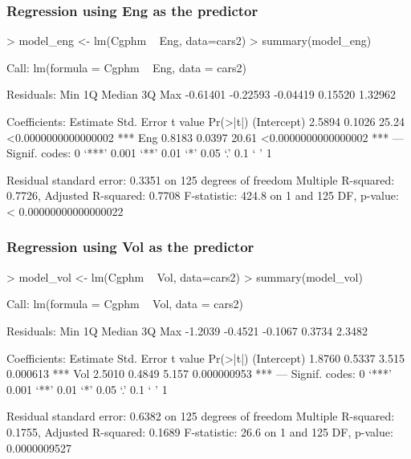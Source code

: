 \documentclass{article}
\begin{document}
\subsubsection*{Regression using Eng as the predictor}
\begin{Schunk}
\begin{Sinput}
> model_eng <- lm(Cgphm ~ Eng, data=cars2)
> summary(model_eng)
\end{Sinput}
\begin{Soutput}
Call:
lm(formula = Cgphm ~ Eng, data = cars2)

Residuals:
     Min       1Q   Median       3Q      Max 
-0.61401 -0.22593 -0.04419  0.15520  1.32962 

Coefficients:
            Estimate Std. Error t value            Pr(>|t|)    
(Intercept)   2.5894     0.1026   25.24 <0.0000000000000002 ***
Eng           0.8183     0.0397   20.61 <0.0000000000000002 ***
---
Signif. codes:  0 ‘***’ 0.001 ‘**’ 0.01 ‘*’ 0.05 ‘.’ 0.1 ‘ ’ 1

Residual standard error: 0.3351 on 125 degrees of freedom
Multiple R-squared:  0.7726,	Adjusted R-squared:  0.7708 
F-statistic: 424.8 on 1 and 125 DF,  p-value: < 0.00000000000000022
\end{Soutput}
\end{Schunk}
\subsubsection*{Regression using Vol as the predictor}
\begin{Schunk}
\begin{Sinput}
> model_vol <- lm(Cgphm ~ Vol, data=cars2)
> summary(model_vol)
\end{Sinput}
\begin{Soutput}
Call:
lm(formula = Cgphm ~ Vol, data = cars2)

Residuals:
    Min      1Q  Median      3Q     Max 
-1.2039 -0.4521 -0.1067  0.3734  2.3482 

Coefficients:
            Estimate Std. Error t value    Pr(>|t|)    
(Intercept)   1.8760     0.5337   3.515    0.000613 ***
Vol           2.5010     0.4849   5.157 0.000000953 ***
---
Signif. codes:  0 ‘***’ 0.001 ‘**’ 0.01 ‘*’ 0.05 ‘.’ 0.1 ‘ ’ 1

Residual standard error: 0.6382 on 125 degrees of freedom
Multiple R-squared:  0.1755,	Adjusted R-squared:  0.1689 
F-statistic:  26.6 on 1 and 125 DF,  p-value: 0.0000009527
\end{Soutput}
\end{Schunk}
\end{document}

